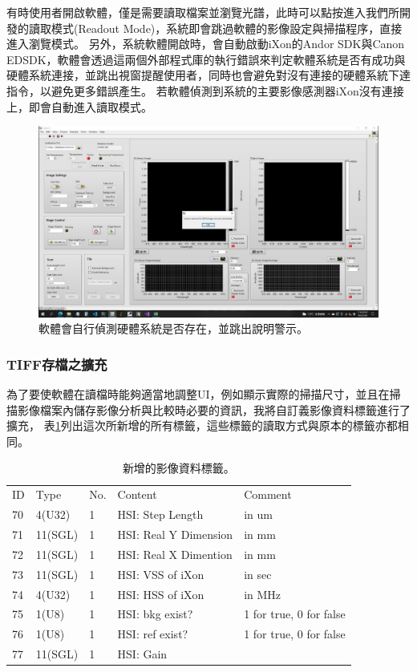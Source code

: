 \documentclass[12pt]{article}
\begin{document}
有時使用者開啟軟體，僅是需要讀取檔案並瀏覽光譜，此時可以點按進入我們所開發的讀取模式(Readout Mode)，系統即會跳過軟體的影像設定與掃描程序，直接進入瀏覽模式。
另外，系統軟體開啟時，會自動啟動iXon的Andor SDK與Canon EDSDK，軟體會透過這兩個外部程式庫的執行錯誤來判定軟體系統是否有成功與硬體系統連接，並跳出視窗提醒使用者，同時也會避免對沒有連接的硬體系統下達指令，以避免更多錯誤產生。
若軟體偵測到系統的主要影像感測器iXon沒有連接上，即會自動進入讀取模式。
\begin{figure}[ht]
    \centering
    \includegraphics[width=\linewidth]{detectHW.jpeg}
    \caption{軟體會自行偵測硬體系統是否存在，並跳出說明警示。}
    \label{figure: detect hardware}
\end{figure}
\subsubsection{TIFF存檔之擴充}
為了要使軟體在讀檔時能夠適當地調整UI，例如顯示實際的掃描尺寸，並且在掃描影像檔案內儲存影像分析與比較時必要的資訊，我將自訂義影像資料標籤進行了擴充，
表\ref{tab: new tag}列出這次所新增的所有標籤，這些標籤的讀取方式與原本的標籤亦都相同。

\begin{table}[ht]
    \begin{tabular}{lllll}
        ID & Type    & No. & Content               & Comment             \\
        70 & 4(U32)  & 1   & HSI: Step Length      & in um                   \\
        71 & 11(SGL) & 1   & HSI: Real Y Dimension & in mm                   \\
        72 & 11(SGL) & 1   & HSI: Real X Dimention & in mm                   \\
        73 & 11(SGL) & 1   & HSI: VSS of iXon      & in sec                  \\
        74 & 4(U32)  & 1   & HSI: HSS of iXon      & in MHz                  \\
        75 & 1(U8)   & 1   & HSI: bkg exist?       & 1 for true, 0 for false \\
        76 & 1(U8)   & 1   & HSI: ref exist?       & 1 for true, 0 for false \\
        77 & 11(SGL) & 1   & HSI: Gain             &
    \end{tabular}
    \caption{新增的影像資料標籤。}
    \label{tab: new tag}
\end{table}
\end{document}
